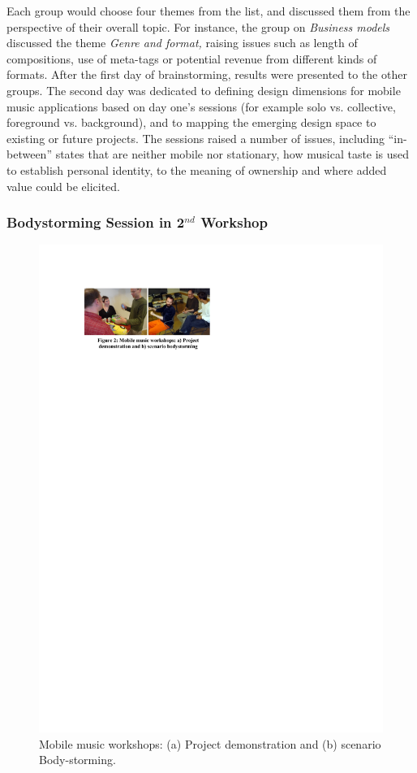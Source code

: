 Each group would choose four themes from the list, and discussed them from the
perspective of their overall topic. For instance, the group on \textit{Business
models }discussed the theme \textit{Genre and format, }raising issues such as
length of compositions, use of meta-tags or potential revenue from different
kinds of formats. After the first day of brainstorming, results were presented to
the other groups. The second day was dedicated to defining design dimensions for
mobile music applications based on day one's sessions (for example solo vs.
collective, foreground vs. background), and to mapping the emerging design space
to existing or future projects. The sessions raised a number of issues, including
``in-between'' states that are neither mobile nor stationary, how musical taste
is used to establish personal identity, to the meaning of ownership and where
added value could be elicited.

\subsubsection{Bodystorming Session in 2$^{nd}$ Workshop}

\begin{figure}[t]
\centering
\includegraphics[width=\textwidth]{img2.pdf}
\caption{Mobile music workshops: (a) Project demonstration and (b) scenario Body-storming.}
\label{Gaye:fig:2} 
\end{figure}

